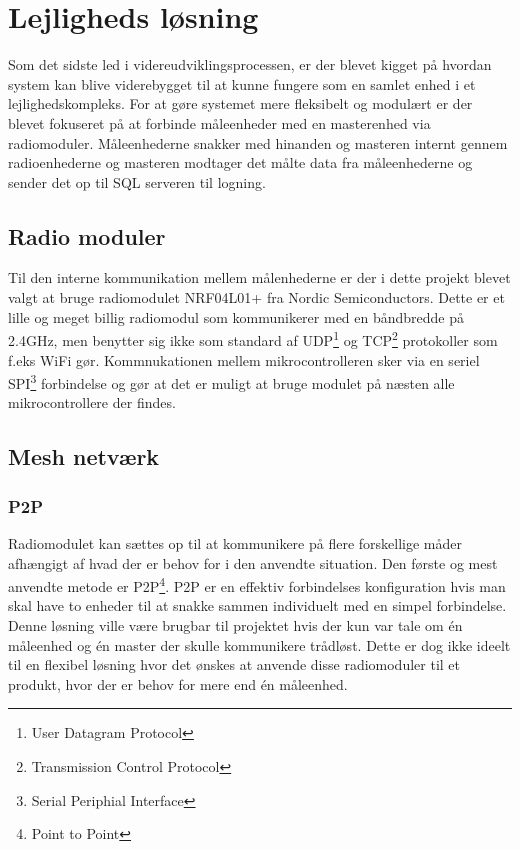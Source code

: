 \section{Lejligheds løsning}
Som det sidste led i videreudviklingsprocessen, er der blevet kigget på hvordan system kan blive viderebygget til at kunne fungere som en samlet enhed i et lejlighedskompleks. For at gøre systemet mere fleksibelt og modulært er der blevet fokuseret på at forbinde måleenheder med en masterenhed via radiomoduler. Måleenhederne snakker med hinanden og masteren internt gennem radioenhederne og masteren modtager det målte data fra måleenhederne og sender det op til SQL serveren til logning.

\subsection{Radio moduler}
Til den interne kommunikation mellem målenhederne er der i dette projekt blevet valgt at bruge radiomodulet NRF04L01+ fra Nordic Semiconductors.
\newline
Dette er et lille og meget billig radiomodul som kommunikerer med en båndbredde på 2.4GHz, men benytter sig ikke som standard af UDP\footnote{User Datagram Protocol} og TCP\footnote{Transmission Control Protocol} protokoller som f.eks WiFi gør. 
Kommnukationen mellem mikrocontrolleren sker via en seriel SPI\footnote{Serial Periphial Interface} forbindelse og gør at det er muligt at bruge modulet på næsten alle mikrocontrollere der findes.

\subsection{Mesh netværk}
\subsubsection*{P2P}
Radiomodulet kan sættes op til at kommunikere på flere forskellige måder afhængigt af hvad der er behov for i den anvendte situation.
Den første og mest anvendte metode er P2P\footnote{Point to Point}.
\newline
P2P er en effektiv forbindelses konfiguration hvis man skal have to enheder til at snakke sammen individuelt med en simpel forbindelse. Denne løsning ville være brugbar til projektet hvis der kun var tale om én måleenhed og én master der skulle kommunikere trådløst. Dette er dog ikke ideelt til en flexibel løsning hvor det ønskes at anvende disse radiomoduler til et produkt, hvor der er behov for mere end én måleenhed.

